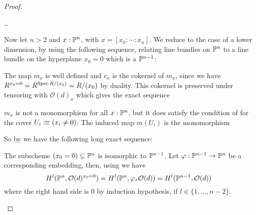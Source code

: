 \begin{proof}
\begin{enumerate}[(i)]
    \dots

    Now let $n>2$ and $x:\mathbb{P}^n$, with $x=[x_0:\cdots:x_n]$.
    We reduce to the case of a lower dimension, by using the following sequence, relating line bundles on $\mathbb{P}^n$ to a line bundle on the hyperplane $x_0=0$ which is a $\mathbb{P}^{n-1}$:
    \begin{center}
    \end{center}
    The map $m_x$ is well defined and $c_x$ is the cokernel of $m_x$, since we have $R^{x_0=0}=R^{\operatorname{Spec} R/(x_0)}=R/(x_0)$ by duality.
    This cokernel is preserved under tensoring with $\mathcal O(d)_x$ which gives the exact sequence
    \begin{center}
    \end{center}
    
    $m_x$ is not a monomorphism for all $x:\mathbb{P}^n$, but it does satisfy the condition of  for the cover $U_i\vcentcolon\mspace{-1.2mu}\equiv (x_i\neq 0)$:
    The induced map $m(U_i)$ is the monomorphism
    \begin{center}
    \end{center}
    So by  we have the following long exact sequence:
    \begin{center}
    \end{center}
    The subscheme $(x_0=0)\subseteq \mathbb{P}^n$ is isomorphic to $\mathbb{P}^{n-1}$.
    Let $\varphi:\mathbb{P}^{n-1}\to \mathbb{P}^n$ be a corresponding embedding, then, using  we have
    \[
      H^{l}(\mathbb{P}^n,\mathcal O(d)^{x_0=0})=H^l(\mathbb{P}^n,\varphi_\ast\mathcal O(d))=H^l(\mathbb{P}^{n-1},\mathcal O(d))
    \]
    where the right hand side is 0 by induction hypothesis, if $l\in\{1,\dots,n-2\}$.
    

\end{enumerate}
\end{proof}
